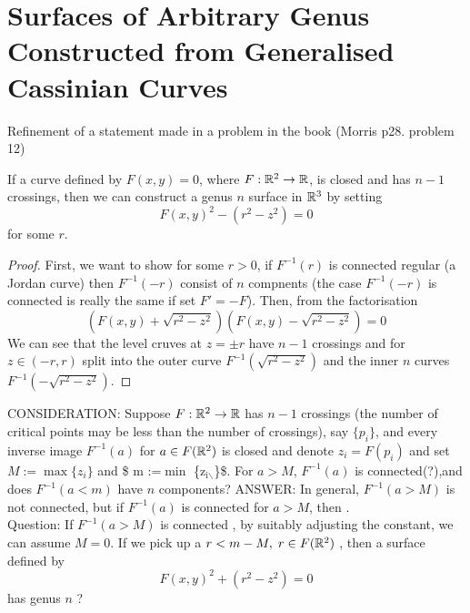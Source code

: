 \documentclass{article}
\begin{document}
\section{Surfaces of Arbitrary Genus Constructed from Generalised Cassinian Curves}
\label{sec-2}
Refinement of a statement made in a problem in the book (Morris \cite{Hirsch} p28. problem 12)
\begin{thm}
 If a curve defined by $F(x,y) = 0$, where $F:\mathbb R^2 \rightarrow \mathbb R$, is closed and has $n-1$ crossings, then we can construct a genus $n$ surface in $\mathbb R^3$ by setting
\begin{equation}
\label{ }
F(x,y)^2 - ( r^2 - z^2) = 0 
\end{equation}
for some $r$.
\end{thm}
\begin{proof}
 First, we want to show for some $r > 0$, if $F^{-1}(r)$ is connected regular (a Jordan curve) then $F^{-1}(-r)$ consist of $n$ compnents (the case $F^{-1}(-r)$ is connected is really the same if set $F' = -F$). Then, from the factorisation
\begin{equation}
\label{ }
(F(x,y) + \sqrt{r^2-z^2})(F(x,y) - \sqrt{r^2-z^2}) = 0
\end{equation}
 We can see that the level cruves at $z=\pm r$ have $n-1$ crossings and for $z \in (-r,r)$ split into the outer curve $F^{-1}(\sqrt{r^2-z^2})$ and the inner $n$ curves $F^{-1}(-\sqrt{r^2-z^2})$.
\end{proof}
CONSIDERATION: Suppose $F:\mathbb R^2 \rightarrow \mathbb R$ has $n-1$ crossings (the number of critical points may be less than the number of crossings), say $\{p_{i}\}$, and every inverse image $F^{-1}(a)$ for $a\in F(\mathbb R^2)$ is closed and denote $z_i=F(p_i)$ and set $M:= \max\{z_i\}$ and \$ m :=$\min$ \{z$_{\text{i$\backslash$}}$\}\$. For $a>M$, $F^{-1}(a)$ is connected(?),and does $F^{-1}(a<m)$ have $n$ components? ANSWER: In general, $F^{-1}(a>M)$ is not connected, but if $F^{-1}(a)$ is connected for $a>M$, then .\\
Question: If $F^{-1}(a>M)$ is connected , by suitably adjusting the constant, we can assume $M=0$. If we pick up a $r< m-M, \; r \in F(\mathbb R^2)$ , then a surface defined by
\begin{equation}
\label{ }
F(x,y)^2 + (r^2 - z^2) = 0
\end{equation}
has genus $n$ ?
\end{document}
